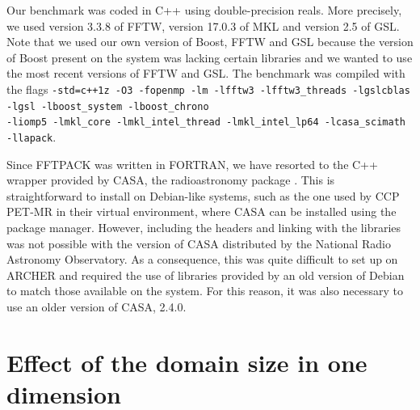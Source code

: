\documentclass[12pt, a4paper]{article} \setlength{\textheight}{24cm}
\begin{document}
Our benchmark was coded in C++ using double-precision reals. More
precisely, we used version 3.3.8 of FFTW, version 17.0.3 of MKL and
version 2.5 of GSL. Note that we used our own version of Boost, FFTW
and GSL because the version of Boost present on the system was lacking
certain libraries and we wanted to use the most recent versions of
FFTW and GSL. The benchmark was compiled with the flags
\texttt{-std=c++1z -O3 -fopenmp -lm -lfftw3 -lfftw3\_threads
  -lgslcblas -lgsl -lboost\_system -lboost\_chrono\\-liomp5
  -lmkl\_core -lmkl\_intel\_thread -lmkl\_intel\_lp64 -lcasa\_scimath
  \\-llapack}.

Since FFTPACK was written in FORTRAN, we have resorted to the C++
wrapper provided by CASA, the radioastronomy package \cite{casa}. This
is straightforward to install on Debian-like systems, such as the one
used by CCP PET-MR in their virtual environment, where CASA can be
installed using the package manager. However, including the headers
and linking with the libraries was not possible with the version of
CASA distributed by the National Radio Astronomy Observatory.  As a
consequence, this was quite difficult to set up on ARCHER and required
the use of libraries provided by an old version of Debian to match
those available on the system. For this reason, it was also necessary
to use an older version of CASA, 2.4.0.


\section{Effect of the domain size in one
  dimension}\label{PERFORMANCE1D}
\end{document}
